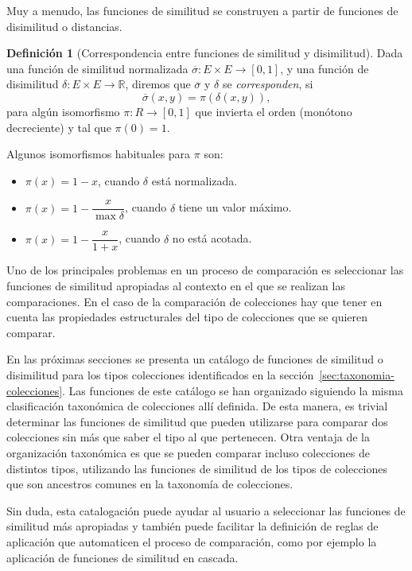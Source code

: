 \documentclass[a4paper,10pt,twoside]{article}
\theoremstyle{definition}
\newtheorem{definition}{Definición}
\begin{document}
Muy a menudo, las funciones de similitud se construyen a partir de funciones de disimilitud o distancias.

\begin{definition}[Correspondencia entre funciones de similitud y disimilitud]
Dada una función de similitud normalizada $\overline\sigma:E\times E \longrightarrow [0,1]$, y una función de disimilitud $\delta:E\times E \longrightarrow \mathbb{R}$, diremos que $\overline\sigma$ y $\delta$ se
\emph{corresponden}, si 
\[ \overline\sigma(x,y) = \pi(\delta(x,y)), \] 
para algún isomorfismo $\pi: R \longrightarrow [0,1]$ que invierta el orden (monótono decreciente) y tal que $\pi(0)=1$.
\end{definition}

Algunos isomorfismos habituales para $\pi$ son:
\begin{itemize}
\item $\pi(x)=1-x$, cuando $\delta$ está normalizada.
\item $\pi(x)=1-\dfrac{x}{\max \delta}$, cuando $\delta$ tiene un valor máximo.
\item $\pi(x)=1-\dfrac{x}{1+x}$, cuando $\delta$ no está acotada.
\end{itemize}

Uno de los principales problemas en un proceso de comparación es seleccionar las funciones de similitud apropiadas al contexto en el que se realizan las comparaciones. 
En el caso de la comparación de colecciones hay que tener en cuenta las propiedades estructurales del tipo de colecciones que se quieren comparar.  

En las próximas secciones se presenta un catálogo de funciones de similitud o disimilitud para los tipos colecciones identificados en la sección~\ref{sec:taxonomia-colecciones}.
Las funciones de este catálogo se han organizado siguiendo la misma clasificación taxonómica de colecciones allí definida. 
De esta manera, es trivial determinar las funciones de similitud que pueden utilizarse para comparar dos colecciones sin más que saber el tipo al que pertenecen.
Otra ventaja de la organización taxonómica es que se pueden comparar incluso colecciones de distintos tipos, utilizando las funciones de similitud de los tipos de colecciones que son ancestros comunes en la taxonomía de colecciones.

Sin duda, esta catalogación puede ayudar al usuario a seleccionar las funciones de similitud más apropiadas y también puede facilitar la definición de reglas de aplicación que automaticen el proceso de comparación,
como por ejemplo la aplicación de funciones de similitud en cascada.
\end{document}
